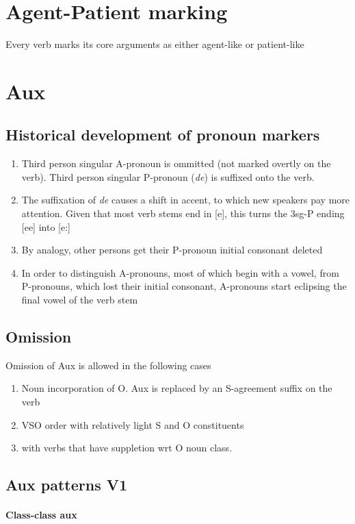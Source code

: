 \documentclass[8pt]{book}
\begin{document}
\section{Agent-Patient marking}
Every verb marks its core arguments as either agent-like or patient-like

\section{Aux}

\subsection{Historical development of pronoun markers}
\begin{enumerate}
	\item Third person singular A-pronoun is ommitted (not marked overtly on the verb). Third person singular P-pronoun (\textit{de}) is suffixed onto the verb.
	\item The suffixation of \textit{de} causes a shift in accent, to which new speakers pay more attention. Given that most verb stems end in [e], this turns the 3sg-P ending [ee] into [e:]
	\item By analogy, other persons get their P-pronoun initial consonant deleted
	\item In order to distinguish A-pronouns, most of which begin with a vowel, from P-pronouns, which lost their initial consonant, A-pronouns start eclipsing the final vowel of the verb stem
\end{enumerate}

\subsection{Omission}
Omission of Aux is allowed in the following cases
\begin{enumerate}
	\item Noun incorporation of O. Aux is replaced by an S-agreement suffix on the verb
	\item VSO order with relatively light S and O constituents
	\item with verbs that have suppletion wrt O noun class.
\end{enumerate}

\subsection{Aux patterns V1}
\paragraph{Class-class aux}
\end{document}

